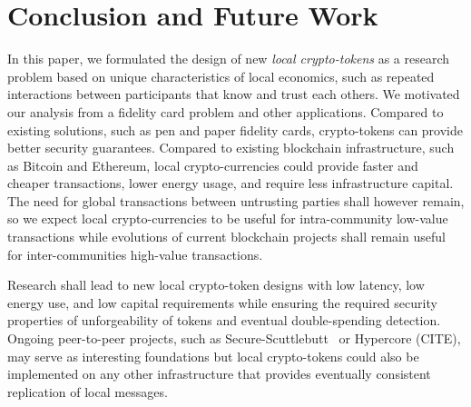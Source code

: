 \documentclass[sigplan,screen,10pt]{acmart}
\newcommand\ssbtokens[0]{\textit{SSB-Tokens} }
\begin{document}

\section{Conclusion and Future Work}
\label{section:conclusion}

In this paper, we formulated the design of new \textit{local crypto-tokens} as a research problem based on unique characteristics of local economics, such as repeated interactions between participants that know and trust each others. We motivated our analysis from a fidelity card problem and other applications. Compared to existing solutions, such as pen and paper fidelity cards, crypto-tokens can provide better security guarantees. Compared to existing blockchain infrastructure, such as Bitcoin and Ethereum, local crypto-currencies could provide faster and cheaper transactions, lower energy usage, and require less infrastructure capital. The need for global transactions between untrusting parties shall however remain, so we expect local crypto-currencies to be useful for intra-community low-value transactions while evolutions of current blockchain projects shall remain useful for inter-communities high-value transactions.

Research shall lead to new local crypto-token designs with low latency, low energy use, and low capital requirements while ensuring the required security properties of unforgeability of tokens and eventual double-spending detection. Ongoing peer-to-peer projects, such as Secure-Scuttlebutt~\cite{tarr2019ssb} or Hypercore (CITE), may serve as interesting foundations but local crypto-tokens could also be implemented on any other infrastructure that provides eventually consistent replication of local messages.



\end{document}
